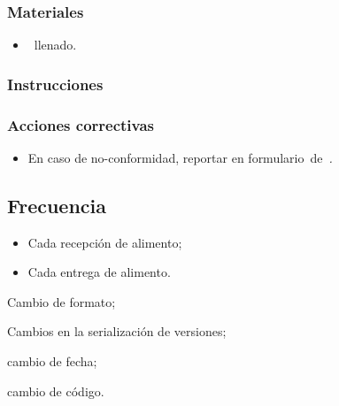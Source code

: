 \subsubsection{Materiales}
\begin{itemize}
	\item \Oent\ llenado.
\end{itemize}

\subsubsection{Instrucciones}



\AcPGen	%


\subsubsection{Acciones correctivas}
\begin{itemize}
\item En caso de no-conformidad, reportar en \mbox{formulario de {\slshape \RAC.}}
\end{itemize}

\subsection{Frecuencia}
\begin{itemize}
	\item Cada recepción de alimento;
	\item Cada entrega de alimento.
\end{itemize}

\begin{changelog}[title=Registro de cambios,simple, sectioncmd=\subsection*,label=changelog-\thesection-\MayorVer.\MenorVer]

	\begin{version}[v=2.1, date=2023--01, author=Pablo E. Alanis]
		\item Cambio de formato;
		\item Cambios en la serialización de versiones;
	\end{version}

	\begin{version}[v=1.3, date=2022--05, author=Alonso M.]
		\item cambio de fecha;
		\item cambio de código.
	\end{version}

\end{changelog}